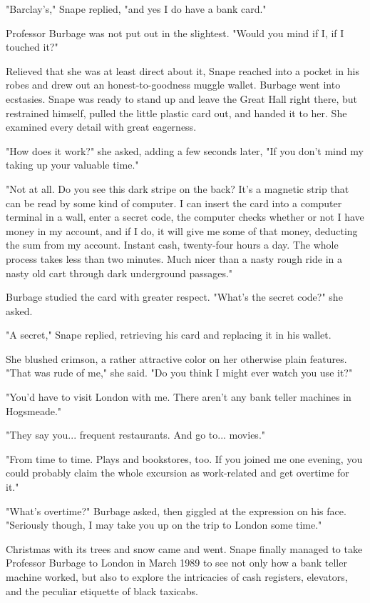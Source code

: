 \documentclass[a4paper,11pt]{article}
\begin{document}
"Barclay's," Snape replied, "and yes I do have a bank card."

Professor Burbage was not put out in the slightest. "Would you mind if I, if I touched it?"

Relieved that she was at least direct about it, Snape reached into a pocket in his robes and drew out an honest-to-goodness muggle wallet. Burbage went into ecstasies. Snape was ready to stand up and leave the Great Hall right there, but restrained himself, pulled the little plastic card out, and handed it to her. She examined every detail with great eagerness.

"How does it work?" she asked, adding a few seconds later, "If you don't mind my taking up your valuable time."

"Not at all. Do you see this dark stripe on the back? It's a magnetic strip that can be read by some kind of computer. I can insert the card into a computer terminal in a wall, enter a secret code, the computer checks whether or not I have money in my account, and if I do, it will give me some of that money, deducting the sum from my account. Instant cash, twenty-four hours a day. The whole process takes less than two minutes. Much nicer than a nasty rough ride in a nasty old cart through dark underground passages."

Burbage studied the card with greater respect. "What's the secret code?" she asked.

"A secret," Snape replied, retrieving his card and replacing it in his wallet.

She blushed crimson, a rather attractive color on her otherwise plain features. "That was rude of me," she said. "Do you think I might ever watch you use it?"

"You'd have to visit London with me. There aren't any bank teller machines in Hogsmeade."

"They say you... frequent restaurants. And go to... movies."

"From time to time. Plays and bookstores, too. If you joined me one evening, you could probably claim the whole excursion as work-related and get overtime for it."

"What's overtime?" Burbage asked, then giggled at the expression on his face. "Seriously though, I may take you up on the trip to London some time."

Christmas with its trees and snow came and went. Snape finally managed to take Professor Burbage to London in March 1989 to see not only how a bank teller machine worked, but also to explore the intricacies of cash registers, elevators, and the peculiar etiquette of black taxicabs.
\end{document}
